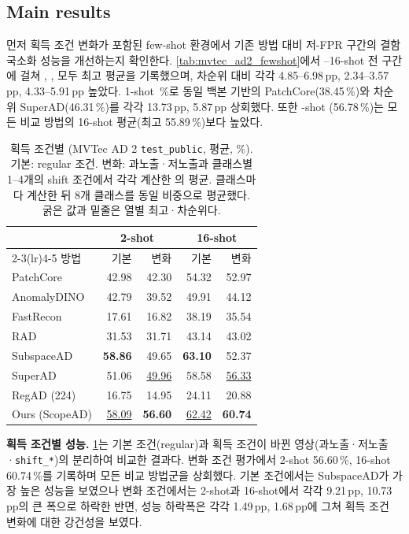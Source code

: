 \subsection{Main results}
\label{sec:experiments:main}

먼저 획득 조건 변화가 포함된 few-shot 환경에서  기존 방법 대비 저-FPR 구간의 결함 국소화 성능을 개선하는지 확인한다.
\cref{tab:mvtec_ad2_fewshot}에서 --16-shot 전 구간에 걸쳐 \AUPRO, \pAUROC, \IAUROC{} 모두 최고 평균을 기록했으며, 차순위 대비 각각 4.85--6.98\,pp, 2.34--3.57\,pp, 4.33--5.91\,pp 높았다.
1-shot \,\%로 동일 백본 기반의 PatchCore(38.45\,\%)와 차순위 SuperAD(46.31\,\%)를 각각 13.73\,pp, 5.87\,pp 상회했다.
또한 -shot \AUPRO(56.78\,\%)는 모든 비교 방법의 16-shot 평균(최고 55.89\,\%)보다 높았다.

\begin{table}[!t]
\centering\scriptsize\setlength{\tabcolsep}{4pt}
\caption{획득 조건별 \AUPRO{} (MVTec AD 2 \texttt{test\_public}, 평균, \%). 기본: regular 조건. 변화: 과노출·저노출과 클래스별 1--4개의 shift 조건에서 각각 계산한 \AUPRO{}의 평균. 클래스마다 계산한 뒤 8개 클래스를 동일 비중으로 평균했다. 굵은 값과 밑줄은 열별 최고·차순위다.}
\label{tab:condition}
\begin{tabular*}{\columnwidth}{@{\extracolsep{\fill}}lrrrr}
\toprule
& \multicolumn{2}{c}{2-shot} & \multicolumn{2}{c}{16-shot} \\
\cmidrule(lr){2-3}\cmidrule(lr){4-5}
방법 & 기본 & 변화 & 기본 & 변화 \\
\midrule
PatchCore & 42.98 & 42.30 & 54.32 & 52.97 \\
AnomalyDINO & 42.79 & 39.52 & 49.91 & 44.12 \\
FastRecon & 17.61 & 16.82 & 38.19 & 35.54 \\
RAD & 31.53 & 31.71 & 43.14 & 43.02 \\
SubspaceAD & \textbf{58.86} & 49.65 & \textbf{63.10} & 52.37 \\
SuperAD & 51.06 & \underline{49.96} & 58.58 & \underline{56.33} \\
RegAD (224) & 16.75 & 14.95 & 24.11 & 20.88 \\
Ours (ScopeAD) & \underline{58.09} & \textbf{56.60} & \underline{62.42} & \textbf{60.74} \\
\bottomrule
\end{tabular*}
\end{table}

\noindent\textbf{획득 조건별 성능.}
\cref{tab:condition}는 기본 조건(regular)과 획득 조건이 바뀐 영상(과노출·저노출·\texttt{shift\_*})의  분리하여 비교한 결과다.
 변화 조건 평가에서 2-shot 56.60\,\%, 16-shot 60.74\,\%를 기록하며 모든 비교 방법군을 상회했다.
기본 조건에서는 SubspaceAD가 가장 높은 성능을 보였으나 변화 조건에서는 2-shot과 16-shot에서 각각 9.21\,pp, 10.73\,pp의 큰 폭으로 하락한 반면,  성능 하락폭은 각각 1.49\,pp, 1.68\,pp에 그쳐 획득 조건 변화에 대한 강건성을 보였다.

